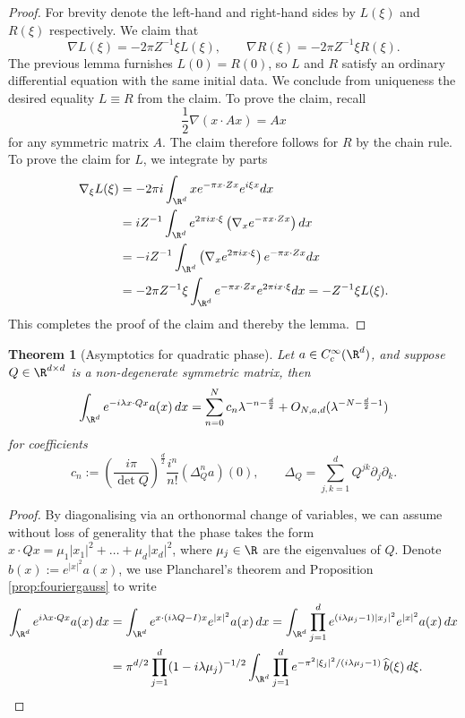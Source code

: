 \documentclass[reqno]{amsart}
\newtheorem{theorem}{Theorem}
\theoremstyle{definition}
\theoremstyle{remark}
\begin{document}
\begin{proof}
	For brevity denote the left-hand and right-hand sides by $L(\xi)$ and $R(\xi)$ respectively. We claim that
		\[ \nabla L(\xi) = -2\pi Z^{-1} \xi L(\xi), \qquad \nabla R(\xi) = -2\pi Z^{-1} \xi R(\xi). \]
	The previous lemma furnishes $L(0) = R(0)$, so $L$ and $R$ satisfy an ordinary differential equation with the same initial data. We conclude from uniqueness the desired equality $L \equiv R$ from the claim. To prove the claim, recall
		\[ \frac12 \nabla (x \cdot A x) = Ax \]
	for any symmetric matrix $A$. The claim therefore follows for $R$ by the chain rule. To prove the claim for $L$, we integrate by parts 
		\begin{align*}
			\nabla_\xi L(\xi) 
				&= -2\pi i \int_{\R^d}  x e^{-\pi x \cdot Z x} e^{i \xi x} dx \\
				&=  i Z^{-1}  \int_{\R^d} e^{2\pi i x \cdot \xi} \left( \nabla_x e^{-\pi x \cdot Z x} \right) dx \\
				&= -i Z^{-1} \int_{\R^d} \left(\nabla_x e^{2 \pi i x \cdot \xi} \right) e^{-\pi x \cdot Z x} dx \\
				&= -2\pi Z^{-1} \xi \int_{\R^d} e^{-\pi x \cdot Z x} e^{2 \pi i x \cdot \xi} dx = -Z^{-1} \xi L(\xi). 
		\end{align*}
	This completes the proof of the claim and thereby the lemma.	
\end{proof}

\begin{theorem}[Asymptotics for quadratic phase]
	Let $a \in C^\infty_c (\R^d)$, and suppose $Q \in \R^{d \times d}$ is a non-degenerate symmetric matrix, then 
		\[ \int_{\R^d} e^{- i \lambda x \cdot Q x} a(x) \, dx = \sum_{n = 0}^N c_n \lambda^{-n - \frac{d}{2}} + O_{N, a, d} (\lambda^{-N - \frac{d}{2} - 1}) \]
	for coefficients
		\[ c_n := \left(\frac{ i\pi}{\det Q}\right)^{\frac{d}{2}} \frac{i^n}{n!} (\Delta^n_Q a) (0), \qquad \Delta_Q = \sum_{j, k = 1}^d Q^{jk} \partial_j \partial_k. \]	\label{thm:quadratic}
\end{theorem}

\begin{proof}
	By diagonalising via an orthonormal change of variables, we can assume without loss of generality that the phase takes the form $x \cdot Q x = \mu_1 |x_1|^2 + \dots + \mu_d |x_d|^2$, where $\mu_j \in \R$ are the eigenvalues of $Q$. Denote $b(x) := e^{|x|^2} a(x)$, we use Plancharel's theorem and Proposition \ref{prop:fouriergauss} to write
		\begin{align*}
			\int_{\R^d} e^{i \lambda x \cdot Qx} a(x) \, dx 
				&= \int_{\R^d} e^{ x \cdot (i \lambda Q -  I) x} e^{|x|^2} a(x) \, dx = \int_{\R^d} \prod_{j = 1}^d e^{(i \lambda \mu_j - 1) |x_j|^2} e^{|x|^2} a(x) \, dx \\
				&= \pi^{d/2} \prod_{j = 1}^d (1 - i \lambda \mu_j)^{-1/2} \int_{\R^d} \prod_{j = 1}^d e^{- \pi^2 |\xi_j|^2/(i \lambda \mu_j - 1)} \, \widehat b(\xi) \, d \xi. 
		\end{align*}	
\end{proof}
\end{document}
